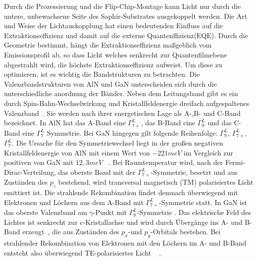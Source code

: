 \vspace{0.1cm}
\noindent
Durch die Prozessierung und die Flip-Chip-Montage kann Licht nur durch die untere, unbewachsene Seite des Saphir-Substrates ausgekoppelt werden. Die Art und Weise der Lichtauskopplung hat einen bedeutenden Einfluss auf die Extraktionseffizienz und damit auf die externe Quantenffizienz(EQE). Durch die Geometrie bestimmt, hängt die Extraktionseffizienz maßgeblich vom Emissionsprofil ab, so dass Licht welches senkrecht zur Quantenfilmebene abgestrahlt wird, die höchste Extraktionseffizienz aufweist. 
Um diese zu optimieren, ist es wichtig die Bandstrukturen zu betrachten.
\newline
Die Valenzbandstrukturen von AlN und GaN unterscheiden sich durch die unterschiedliche anordnung der Bänder. Neben dem Leitungsband gibt es ein durch Spin-Bahn-Wechselwirkung und Kristallfeldenergie dreifach aufgespaltenes Valenzband~\cite{doi:10.1063/1.117689}. Sie werden nach ihrer energetischen Lage als A-,B- und C-Band bezeichnet. In AlN hat das A-Band eine $\Gamma^{L}_{7+}$, das B-Band eine $\Gamma^{L}_{9}$ und das C-Band eine $\Gamma^{L}_{7}$ Symmetrie. Bei GaN hingegen gilt folgende Reihenfolge:  $\Gamma^{L}_{9}$, $\Gamma^{L}_{7+}$, $\Gamma^{L}_{7}$. Die Ursache für den Symmetriewechsel liegt in der großen negativen Kristallfeldenergie von AlN mit einem Wert von $-221meV$ \cite{PhysRevB.87.235209} im Vergleich zur positiven von GaN mit $12,3meV$ ~\cite{PhysRevB.81.155202}. Bei Raumtemperatur wird, nach der Fermi-Dirac-Verteilung, das oberste Band mit der $\Gamma^{L}_{7+}$-Symmetrie, besetzt und aus Zuständen des $p_z$ bestehend, wird transversal magnetisch (TM) polarisiertes Licht emittiert ist. Die strahlende Rekombination findet demnach überwiegend mit Elektronen und Löchern aus dem A-Band mit $\Gamma^{L}_{7+}$-Symmetrie statt.
In GaN ist das oberste Valenzband am $\gamma$-Punkt mit $\Gamma^{L}_{9}$-Symmetrie . Das elektrische Feld des Lichtes ist senkrecht zur c-Kristallachse und wird durch Übergänge ins A- und B- Band erzeugt~\cite{doi:10.1063/1.3574025}, die aus Zuständen des $p_x$-und $p_y$-Orbitals bestehen. Bei strahlender Rekombination von Elektronen mit den Löchern im A- und B-Band entsteht also überwiegend TE-polarisiertes Licht ~\cite{doi:10.1063/1.3574025} . 
%
